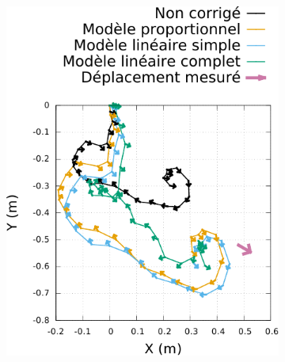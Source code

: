 \begin{figure}[htb]
\begin{subfigure}{0.28\paperwidth}
        \includegraphics[type=pdf,ext=.pdf,read=.pdf,width=1.0\linewidth]{../plot/OdometryCMAES/ordersTraj2}
    \end{subfigure}
    \begin{subfigure}{0.28\paperwidth}
        \centering

\end{subfigure}
\end{figure}
